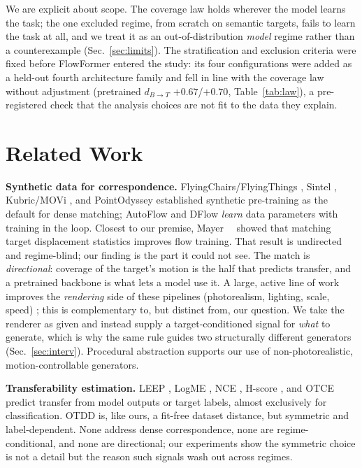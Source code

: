 \documentclass[runningheads]{llncs}
\newcommand{\dbt}{d_{B\to T}}
\begin{document}
We are explicit about scope. The coverage law holds wherever the model learns
the task; the one excluded regime, from scratch on semantic targets, fails to
learn the task at all, and we treat it as an out-of-distribution \emph{model}
regime rather than a counterexample (Sec.~\ref{sec:limits}). The stratification
and exclusion criteria were fixed before FlowFormer entered the study: its four
configurations were added as a held-out fourth architecture family and fell in
line with the coverage law without adjustment (pretrained $\dbt$
$+0.67$/$+0.70$, Table~\ref{tab:law}), a pre-registered check that the analysis
choices are not fit to the data they explain.

\section{Related Work}
\label{sec:related}

\noindent\textbf{Synthetic data for correspondence.}
FlyingChairs/FlyingThings \cite{mayer2016FlyingThingsDataset}, Sintel
\cite{sintel}, Kubric/MOVi \cite{greff2021kubric}, and PointOdyssey
\cite{pointodyssey} established synthetic pre-training as the default for
dense matching; AutoFlow \cite{sun2021autoflow} and DFlow \cite{im2022dflow}
\emph{learn} data parameters with training in the loop. Closest to our
premise, Mayer~\etal~\cite{mayer2018what} showed that matching target
displacement statistics improves flow training. That result is undirected and
regime-blind; our finding is the part it could not see. The match is
\emph{directional}: coverage of the target's motion is the half that predicts
transfer, and a pretrained backbone is what lets a model use it. A large, active
line of work improves the \emph{rendering} side of these pipelines (photorealism,
lighting, scale, speed) \cite{greff2021kubric,pointodyssey}; this is
complementary to, but distinct from, our question. We take the renderer as given and instead supply a
target-conditioned signal for \emph{what} to generate, which is why the same
rule guides two structurally different generators (Sec.~\ref{sec:interv}).
Procedural abstraction \cite{Baradad2021LookingAtNoise,white2009mandelbulb}
supports our use of non-photorealistic, motion-controllable generators.

\noindent\textbf{Transferability estimation.}
LEEP \cite{nguyen2020leep}, LogME \cite{you2021logme}, NCE
\cite{tran2019transferability}, H-score \cite{bao2019information}, and OTCE
\cite{tan2021otce} predict transfer from model outputs or target labels,
almost exclusively for classification. OTDD \cite{alvarez2020geometric} is,
like ours, a fit-free dataset distance, but symmetric and label-dependent.
None address dense correspondence, none are regime-conditional, and none are
directional; our experiments show the symmetric choice is not a detail but
the reason such signals wash out across regimes.
\end{document}
